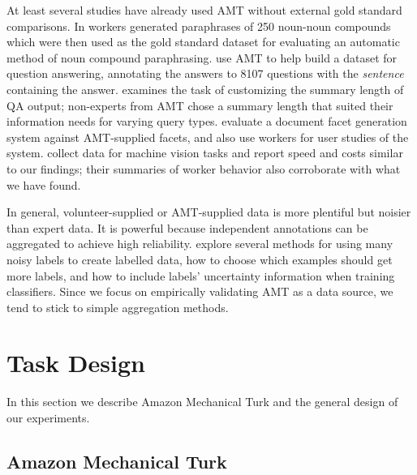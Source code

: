 \documentclass[11pt]{article}
\begin{document}
At least several studies have already used AMT without external gold standard comparisons.
In \cite{NakovLREC:08} workers generated paraphrases of 250 noun-noun compounds which were then used
as the gold standard dataset for evaluating an automatic method of noun compound paraphrasing.
 use AMT to help build a dataset for question answering, 
annotating the answers to 8107
questions with the \textit{sentence}
containing the answer.  
 examines the task of
customizing the summary length of QA output;
non-experts from AMT chose a summary length that suited their information needs for varying
query types.  
 evaluate a document facet generation system against AMT-supplied facets, and also use workers for user studies of the system.   collect data for machine vision tasks and report speed and costs similar to our findings; their summaries of worker behavior also corroborate with what we have found.

In general, volunteer-supplied or AMT-supplied data is more plentiful but noisier than expert data.  It is powerful because independent annotations can be aggregated to achieve high reliability.   explore several methods for using many noisy labels to create labelled data, how to choose which examples should get more labels, and how to include labels' uncertainty information when training classifiers.  Since we focus on empirically validating AMT as a data source, we tend to stick to simple aggregation methods.

\section{ Task Design }

In this section we describe Amazon Mechanical Turk and the general design of our experiments.

\subsection{ Amazon Mechanical Turk }
\end{document}
